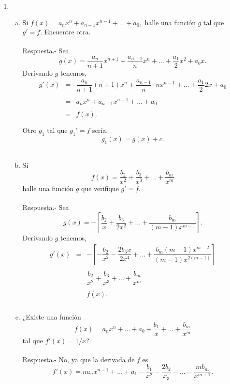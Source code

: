 \begin{enumerate}[\bfseries 1.]
     \item 
	 \begin{enumerate}[(a)]

	     \item Si $f(x)=a_n x^n + a_{n-1} x^{n-1}+\ldots + a_0,$ halle una función $g$ tal que $g'=f$. Encuentre otra.\\\\
		 Respuesta.-\; Sea 
		 $$g(x)=\dfrac{a_n}{n+1}x^{n+1}+\dfrac{a_{n-1}}{n}x^n+\ldots + \dfrac{a_1}{2}x^2+a_0 x.$$
		 Derivando $g$ tenemos,
		 $$\begin{array}{rcl}
		     g'(x)&=&\dfrac{a_n}{n+1}(n+1)x^n + \dfrac{a_{n-1}}{n}\cdot n x^{n-1}+\ldots + \dfrac{a_1}{2}2x+a_0\\\\
			  &=& a_nx^n+a_{n-1}x^{n-1}+\ldots + a_0\\\\
			  &=&f(x).\\\\
		\end{array}$$
		Otro $g_1$ tal que $g_1'=f$ sería,
		$$g_1(x)=g(x)+c.$$\\


	     \item Si $$f(x)=\dfrac{b_2}{x^2}+\dfrac{b_3}{x^3}+\ldots + \dfrac{b_m}{x^m}$$
	     halle una función $g$ que verifique $g'=f.$\\\\
		 Respuesta.-\; Sea
		 $$g(x)=-\left[\dfrac{b_2}{x}+\dfrac{b_3}{2x^2}+\ldots + \dfrac{b_m}{(m-1)x^{m-1}}\right].$$
		 Derivando $g$ tenemos,
		 $$\begin{array}{rcl}
		     g'(x)&=&-\left[-\dfrac{b_2}{x^2}-\dfrac{2b_3 x}{2x^4}+\ldots + \dfrac{b_m(m-1)x^{m-2}}{(m-1)x^{2(m-1)}}\right]\\\\
			  &=&\dfrac{b_2}{x^2}+\dfrac{b_3}{x^3}+\ldots + \dfrac{b_m}{x^m}\\\\
			  &=&f(x).\\\\
		 \end{array}$$
		 \vspace{.5cm}


	     \item ¿Existe una función 
	     $$f(x)=a_nx^n + \ldots + a_0 + \dfrac{b_1}{x}+\ldots + \dfrac{b_m}{x^m}$$
	     tal que $f'(x)=1/x$?.\\\\
		 Respuesta.-\; No, ya que la derivada de $f$ es
		 $$f'(x)=na_n x^{n-1}+\ldots + a_1 - \dfrac{b_1}{x^2}-\dfrac{2b_2}{x_3}-\ldots - \dfrac{mb_m}{x^{m+1}}.$$\\


\end{enumerate}
\end{enumerate}
